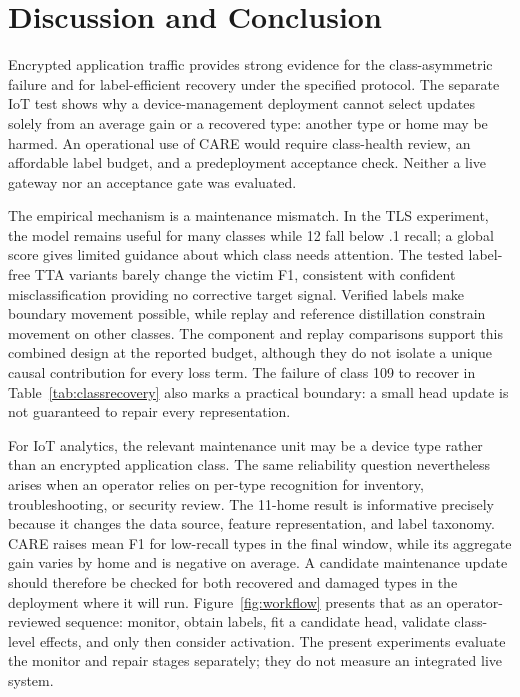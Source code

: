 \documentclass[journal]{IEEEtran}
\newcommand{\ours}{CARE}
\begin{document}
\section{Discussion and Conclusion}
Encrypted application traffic provides strong evidence for the class-asymmetric failure and for label-efficient recovery under the specified protocol. The separate IoT test shows why a device-management deployment cannot select updates solely from an average gain or a recovered type: another type or home may be harmed. An operational use of \ours{} would require class-health review, an affordable label budget, and a predeployment acceptance check. Neither a live gateway nor an acceptance gate was evaluated.

The empirical mechanism is a maintenance mismatch. In the TLS experiment, the model remains useful for many classes while 12 fall below .1 recall; a global score gives limited guidance about which class needs attention. The tested label-free TTA variants barely change the victim F1, consistent with confident misclassification providing no corrective target signal. Verified labels make boundary movement possible, while replay and reference distillation constrain movement on other classes. The component and replay comparisons support this combined design at the reported budget, although they do not isolate a unique causal contribution for every loss term. The failure of class 109 to recover in Table~\ref{tab:classrecovery} also marks a practical boundary: a small head update is not guaranteed to repair every representation.

For IoT analytics, the relevant maintenance unit may be a device type rather than an encrypted application class. The same reliability question nevertheless arises when an operator relies on per-type recognition for inventory, troubleshooting, or security review. The 11-home result is informative precisely because it changes the data source, feature representation, and label taxonomy. CARE raises mean F1 for low-recall types in the final window, while its aggregate gain varies by home and is negative on average. A candidate maintenance update should therefore be checked for both recovered and damaged types in the deployment where it will run. Figure~\ref{fig:workflow} presents that as an operator-reviewed sequence: monitor, obtain labels, fit a candidate head, validate class-level effects, and only then consider activation. The present experiments evaluate the monitor and repair stages separately; they do not measure an integrated live system.
\end{document}
